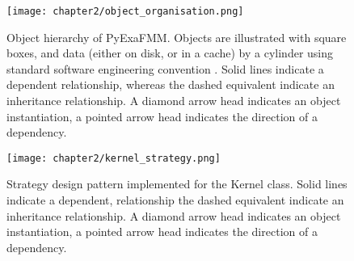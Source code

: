 \begin{figure}
    \centering
    {\texttt{[image: chapter2/object\_organisation.png]}}
    \vspace{0pt}
    \caption{Object hierarchy of \gls{PyExaFMM}. Objects are illustrated with
    square boxes, and data (either on disk, or in a cache) by a cylinder using
    standard software engineering convention \cite{Gamma:1994:Addison}. Solid
    lines indicate a dependent relationship, whereas the dashed equivalent
    indicate an inheritance relationship. A diamond arrow head indicates an
    object instantiation, a pointed arrow head indicates the direction of a
    dependency.}
    \label{fig:2_5_architecture}
\end{figure}

\begin{figure}
    \centering
    {\texttt{[image: chapter2/kernel\_strategy.png]}}
    \vspace{0pt}
    \caption{Strategy design pattern implemented for the Kernel class.  Solid
    lines indicate a dependent, relationship the dashed equivalent
    indicate an inheritance relationship. A diamond arrow head indicates an
    object instantiation, a pointed arrow head indicates the direction of a
    dependency.}
    \label{fig:2_5_strategy_kernel}
\end{figure}

